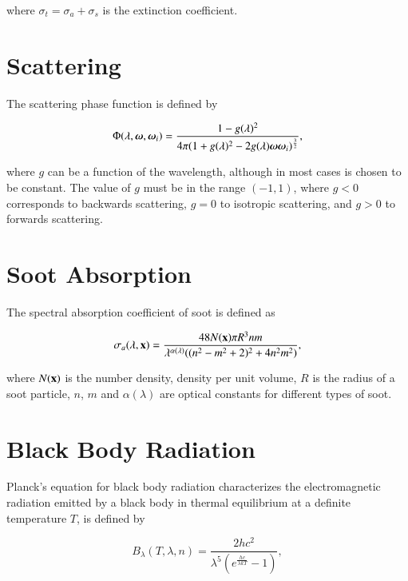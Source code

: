 where $\sigma_t = \sigma_a + \sigma_s$ is the extinction coefficient.

\section{Scattering}
\label{sec:scattering}

The scattering phase function is defined by

\begin{equation}
\Phi (\lambda, \boldsymbol{\omega}, \boldsymbol{\omega}_i) = \frac{1 - g(\lambda)^2}{4 \pi(1 + g(\lambda)^2 - 2 g(\lambda) \boldsymbol{\omega} \boldsymbol{\omega}_i)^{\frac{3}{2}}},
\end{equation}

where $g$ can be a function of the wavelength, although in most cases is chosen to be constant.
The value of $g$ must be in the range $(-1, 1)$, where $g < 0$ corresponds to backwards scattering, $g = 0$ to isotropic scattering, and $g > 0$ to forwards scattering.

\section{Soot Absorption}
\label{sec:soot_absorption}

The spectral absorption coefficient of soot is defined as

\begin{equation}
\sigma_a(\lambda, \mathbf{x}) = \frac{48 N(\mathbf{x}) \pi R^3 n m}{\lambda^{\alpha(\lambda)} ((n^2 - m^2 +2)^2 + 4 n^2 m^2)},
\end{equation}

where $N(\mathbf{x})$ is the number density, density per unit volume, $R$ is the radius of a soot particle, $n$, $m$ and $\alpha(\lambda)$ are optical constants for different types of soot.

\section{Black Body Radiation}
\label{sec:black_body_radiation}

Planck's equation for black body radiation characterizes the electromagnetic radiation emitted by a black body in thermal equilibrium at a definite temperature $T$, is defined by

\begin{equation}
B_\lambda(T, \lambda, n) = \frac{2 h c^2}{\lambda^5  (e ^\frac{h c}{\lambda k T} - 1)},
\end{equation}


